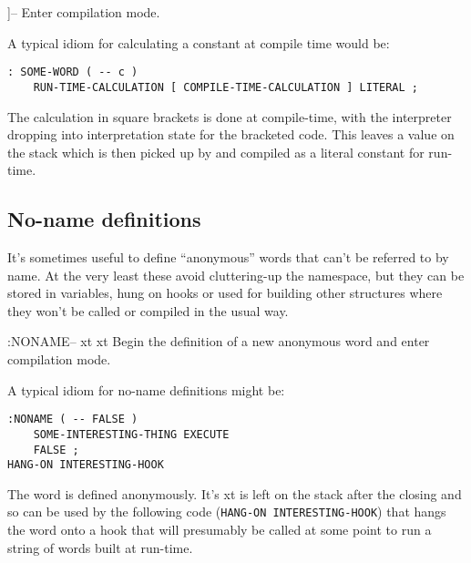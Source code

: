 \begin{defword}{]}{--}
  Enter compilation mode.
\end{defword}

A typical idiom for calculating a constant at compile time would be:

\begin{verbatim}
: SOME-WORD ( -- c )
    RUN-TIME-CALCULATION [ COMPILE-TIME-CALCULATION ] LITERAL ;
\end{verbatim}

\noindent The calculation in square brackets is done at compile-time,
with the interpreter dropping into interpretation state for the
bracketed code. This leaves a value on the stack which is then picked
up by  and compiled as a literal constant for run-time. 

\subsection{No-name definitions}
\label{sec:colon-noname}

It's sometimes useful to define ``anonymous'' words that can't be
referred to by name. At the very least these avoid cluttering-up the
namespace, but they can be stored in variables, hung on hooks or used
for building other structures where they won't be called or compiled
in the usual way.

\begin{defword}{:NONAME}{-- xt xt}
  Begin the definition of a new anonymous word and enter compilation
  mode.
\end{defword}

A typical idiom for no-name definitions might be:

\begin{verbatim}
:NONAME ( -- FALSE )
    SOME-INTERESTING-THING EXECUTE
    FALSE ;
HANG-ON INTERESTING-HOOK
\end{verbatim}

\noindent The word is defined anonymously. It's xt is left on the
stack after the closing \word{;} and so can be used by the following
code (\texttt{HANG-ON INTERESTING-HOOK}) that hangs the word onto a
hook that will presumably be called at some point to run a string of
words built at run-time.

